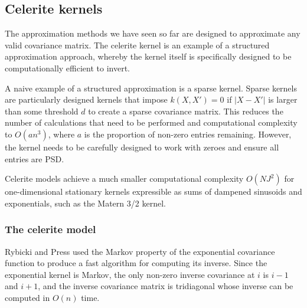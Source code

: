 

% 
% 
% 

\subsection{Celerite kernels \cite{foreman-mackay}}
The approximation methods we have seen so far are designed to approximate any valid covariance matrix. The celerite kernel is an example of a structured approximation approach, whereby the kernel itself is specifically designed to be computationally efficient to invert.

A naive example of a structured approximation is a sparse kernel. Sparse kernels \cite{big-data} are particularly designed kernels that impose $k(X,X') = 0$ if $|X - X'|$ is larger than some threshold $d$ to create a sparse covariance matrix. This reduces the number of calculations that need to be performed and computational complexity to $O(an^3)$, where $a$ is the proportion of non-zero entries remaining. However, the kernel needs to be carefully designed to work with zeroes and ensure all entries are PSD.

Celerite models achieve a much smaller computational complexity $O(N J^2)$ for one-dimensional stationary kernels expressible as sums of dampened sinusoids and exponentials, such as the Matern 3/2 kernel.

\subsubsection{The celerite model}
Rybicki and Press \cite{fast-exp} used the Markov property of the exponential covariance function to produce a fast algorithm for computing its inverse. Since the exponential kernel is Markov, the only non-zero inverse covariance at $i$ is $i-1$ and $i+1$, and the inverse covariance matrix is tridiagonal whose inverse can be computed in $O(n)$ time. 

